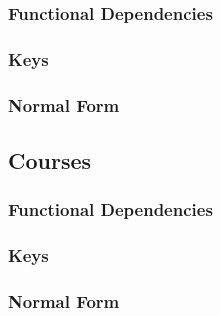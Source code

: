 \documentclass[11pt]{article}
\begin{document}
\subsubsection*{Functional Dependencies}
\label{sec-3-4-1}
\subsubsection*{Keys}
\label{sec-3-4-2}
\subsubsection*{Normal Form}
\label{sec-3-4-3}
\subsection*{Courses}
\label{sec-3-5}
\subsubsection*{Functional Dependencies}
\label{sec-3-5-1}
\subsubsection*{Keys}
\label{sec-3-5-2}
\subsubsection*{Normal Form}
\label{sec-3-5-3}
\end{document}
